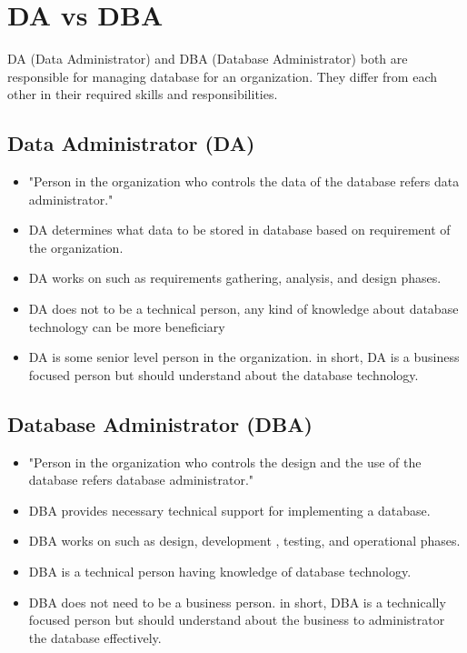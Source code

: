\documentclass[12pt]{article}
\begin{document}
\newpage



\section{DA vs DBA}
DA (Data Administrator) and DBA (Database Administrator) both are responsible for managing database for an organization.
They differ from each other in their required skills and responsibilities.


\subsection{Data Administrator (DA)}

\begin{itemize}
	\item "Person in the organization who controls the data of the database refers data administrator."
	\item DA determines what data to be stored in database based on requirement of the organization.
	\item DA works on such as requirements gathering, analysis, and design phases.
	\item DA does not to be a technical person, any kind of knowledge about database technology can be more beneficiary
	\item DA is some senior level person in the organization. in short, DA is a business focused person but should understand about the database technology.
\end{itemize}


\subsection{Database Administrator (DBA)}

\begin{itemize}
	\item "Person in the organization who controls the design and the use of the database refers database administrator."
	\item DBA provides necessary technical support for implementing a database.
	\item DBA works on such as design, development , testing, and operational phases.
	\item DBA is a technical person having knowledge of database technology.
	\item DBA does not need to be a business person. in short, DBA is a technically focused person but should understand about the business to administrator the database effectively.
\end{itemize}
\end{document}
